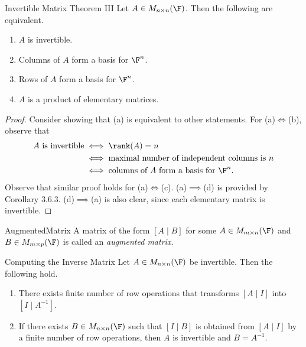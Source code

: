 \documentclass[linearalgebraI]{subfiles}
\begin{document}
    \clearpage
    \begin{theorem}{Invertible Matrix Theorem III}
        Let $A\in M_{n\times n}(\F)$. Then the following are equivalent.
        \begin{enumerate}
            \item $A$ is invertible.
            \item Columns of $A$ form a basis for $\F^n$.
            \item Rows of $A$ form a basis for $\F^n$.
            \item $A$ is a product of elementary matrices.
        \end{enumerate}
    \end{theorem}

    \begin{proof}
        Consider showing that (a) is equivalent to other statements. For (a)$\iff$(b), observe that
        \begin{align*}
            A\text{ is invertible} & \iff \rank(A) = n \\
                                   & \iff \text{maximal number of independent columns is }n \\
                                   & \iff \text{columns of }A\text{ form a basis for }\F^n.
        \end{align*}
        Observe that similar proof holds for (a)$\iff$(c). (a)$\implies$(d) is provided by Corollary 3.6.3. (d)$\implies$(a) is also clear, since each elementary matrix is invertible. 
    \end{proof}

    \begin{definition}{Augmented}{Matrix}
        A matrix of the form $\left[ A\mid B \right]$ for some $A\in M_{m\times n}(\F)$ and $B\in M_{m\times p}(\F)$ is called an \emph{augmented matrix}.  
    \end{definition}

    \begin{prop}{Computing the Inverse Matrix}
        Let $A\in M_{n\times n}(\F)$ be invertible. Then the following hold.
        \begin{enumerate}
            \item There exists finite number of row operations that transforms $[A\mid I]$ into $[I\mid A^{-1}]$.
            \item If there exists $B\in M_{n\times n}(\F)$ such that $[I\mid B]$ is obtained from $[A\mid I]$ by a finite number of row operations, then $A$ is invertible and $B = A^{-1}$.
        \end{enumerate}
    \end{prop}
\end{document}
